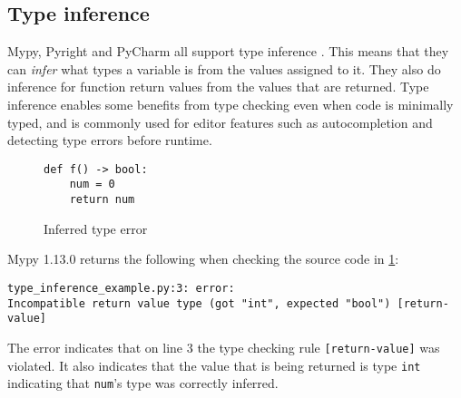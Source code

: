 
\subsection{Type inference}

Mypy, Pyright and PyCharm all support type inference \cite{jetbrains_type_hinting_pycharm, mypy_type_inference, pyright_type_inference}. This means that they can \emph{infer} what types a variable is from the values assigned to it. They also do inference for function return values from the values that are returned. Type inference enables some benefits from type checking even when code is minimally typed, and is commonly used for editor features such as autocompletion and detecting type errors before runtime.

\begin{figure}[t]
    \centering
    \begin{minipage}{0.5\textwidth}
        \centering
        \begin{lstlisting}[linewidth=\textwidth]
def f() -> bool:
    num = 0
    return num
        \end{lstlisting}
    \caption{Inferred type error}
    \label{inferred_type_error}
    \end{minipage}
\end{figure}

Mypy 1.13.0 returns the following when checking the source code in \ref{inferred_type_error}: \begin{verbatim}
type_inference_example.py:3: error: 
Incompatible return value type (got "int", expected "bool") [return-value]
\end{verbatim}

The error indicates that on line 3 the type checking rule {\tt [return-value]} was violated. It also indicates that the value that is being returned is type {\tt int} indicating that {\tt num}'s type was correctly inferred.